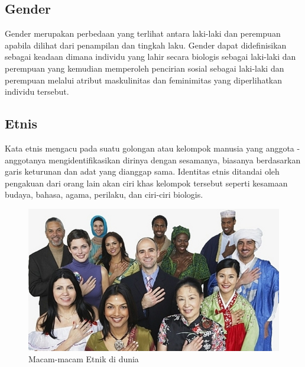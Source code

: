 \subsection{Gender}
Gender merupakan perbedaan yang terlihat antara laki-laki dan perempuan apabila dilihat dari penampilan 
dan tingkah laku. Gender dapat didefinisikan sebagai keadaan dimana individu yang lahir secara biologis 
sebagai laki-laki dan perempuan yang kemudian memperoleh pencirian sosial sebagai laki-laki dan perempuan 
melalui atribut maskulinitas dan feminimitas yang diperlihatkan individu tersebut\citep{LanguageGender}.

\subsection{Etnis}
Kata etnis mengacu pada suatu golongan atau kelompok manusia yang anggota - anggotanya mengidentifikasikan 
dirinya dengan sesamanya, biasanya berdasarkan garis keturunan dan adat yang dianggap sama. Identitas 
etnis ditandai oleh pengakuan dari orang lain akan ciri khas kelompok tersebut seperti kesamaan budaya, 
bahasa, agama, perilaku, dan ciri-ciri biologis\citep{Ethnicity}.
\begin{figure} [H] \centering
    \includegraphics[scale=0.6]{gambar/etnik.png}
    \caption{Macam-macam Etnik di dunia}
    \label{fig:Etnik}
\end{figure}

